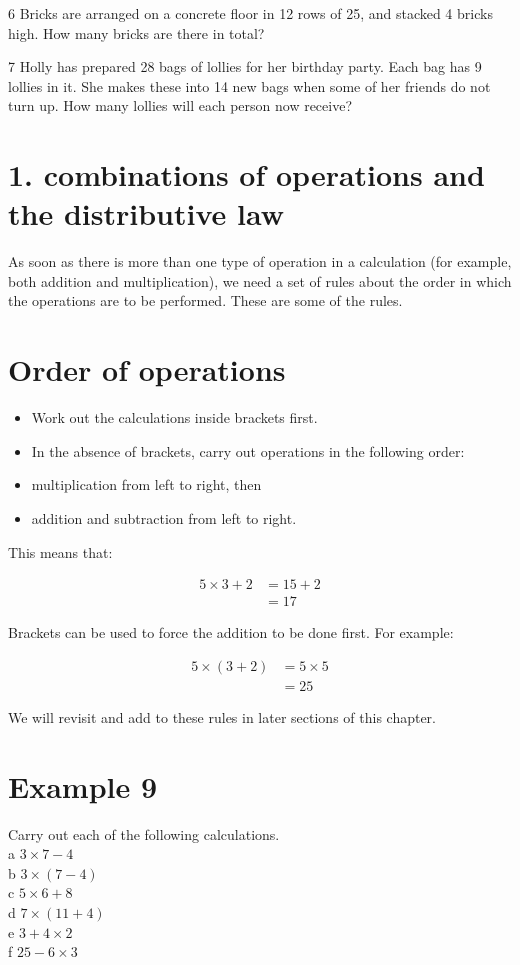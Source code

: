 \documentclass[10pt]{article}
\begin{document}
6 Bricks are arranged on a concrete floor in 12 rows of 25, and stacked 4 bricks high. How many bricks are there in total?

7 Holly has prepared 28 bags of lollies for her birthday party. Each bag has 9 lollies in it. She makes these into 14 new bags when some of her friends do not turn up. How many lollies will each person now receive?

\section*{1. combinations of operations and the distributive law}
As soon as there is more than one type of operation in a calculation (for example, both addition and multiplication), we need a set of rules about the order in which the operations are to be performed. These are some of the rules.

\section*{Order of operations}
\begin{itemize}
  \item Work out the calculations inside brackets first.
  \item In the absence of brackets, carry out operations in the following order:
  \item multiplication from left to right, then
  \item addition and subtraction from left to right.
\end{itemize}

This means that:

\[
\begin{aligned}
5 \times 3+2 & =15+2 \\
& =17
\end{aligned}
\]

Brackets can be used to force the addition to be done first. For example:

\[
\begin{aligned}
5 \times(3+2) & =5 \times 5 \\
& =25
\end{aligned}
\]

We will revisit and add to these rules in later sections of this chapter.

\section*{Example 9}
Carry out each of the following calculations.\\
a \(3 \times 7-4\)\\
b \(3 \times(7-4)\)\\
c \(5 \times 6+8\)\\
d \(7 \times(11+4)\)\\
e \(3+4 \times 2\)\\
f \(25-6 \times 3\)
\end{document}

